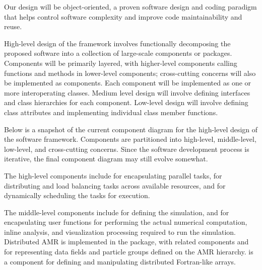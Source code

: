 \documentclass[10pt,twocolumn]{article}
\begin{document}
Our design will be object-oriented, a proven software design and
coding paradigm that helps control software complexity and improve
code maintainability and reuse.

High-level design of the framework involves functionally decomposing
the proposed software into a collection of large-scale components or
packages.  Components will be primarily layered, with higher-level
components calling functions and methods in lower-level components;
cross-cutting concerns will also be implemented as components.  Each
component will be implemented as one or more interoperating classes.
Medium level design will involve defining interfaces and class
hierarchies for each component.  Low-level design will involve
defining class attributes and implementing individual class member
functions.

Below is a snapshot of the current component diagram for the
high-level design of the software framework.  Components are
partitioned into high-level, middle-level, low-level, and
cross-cutting concerns.  Since the software development process is
iterative, the final component diagram may still evolve somewhat.



The high-level components include  for encapsulating
parallel tasks,  for distributing and load balancing
tasks across available resources, and  for dynamically
scheduling the tasks for execution.

The middle-level components include  for defining the
simulation, and  for encapsulating user functions for
performing the actual numerical computation, inline analysis, and
visualization processing required to run the simulation.  Distributed
AMR is implemented in the  package, with related components
 and  for representing data fields and
particle groups defined on the AMR hierarchy.   is a
component for defining and manipulating distributed Fortran-like
arrays.
\end{document}
